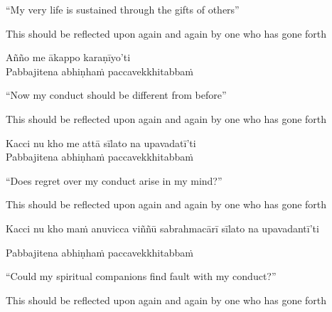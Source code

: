 \begin{english}
  ``My very life is sustained through the gifts of others''\\
\end{english}

\begin{english-hang}
  This should be reflected upon again and again by one who has gone forth
\end{english-hang}

Añño me ākappo karaṇīyo'ti\\
Pabbajitena abhiṇhaṁ paccavekkhitabbaṁ

\begin{english}
  ``Now my conduct should be different from before''\\
\end{english}

\begin{english-hang}
  This should be reflected upon again and again by one who has gone forth
\end{english-hang}

Kacci nu kho me attā sīlato na upavadatī'ti\\
Pabbajitena abhiṇhaṁ paccavekkhitabbaṁ

\begin{english}
  ``Does regret over my conduct arise in my mind?''\\
\end{english}

\begin{english-hang}
  This should be reflected upon again and again by one who has gone forth
\end{english-hang}

\begin{pali-hang}
Kacci nu kho maṁ anuvicca viññū sabrahmacārī sīlato na upavadantī'ti\\
\end{pali-hang}
Pabbajitena abhiṇhaṁ paccavekkhitabbaṁ

\begin{english}
  ``Could my spiritual companions find fault with my conduct?''\\
\end{english}

\begin{english-hang}
  This should be reflected upon again and again by one who has gone forth
\end{english-hang}

